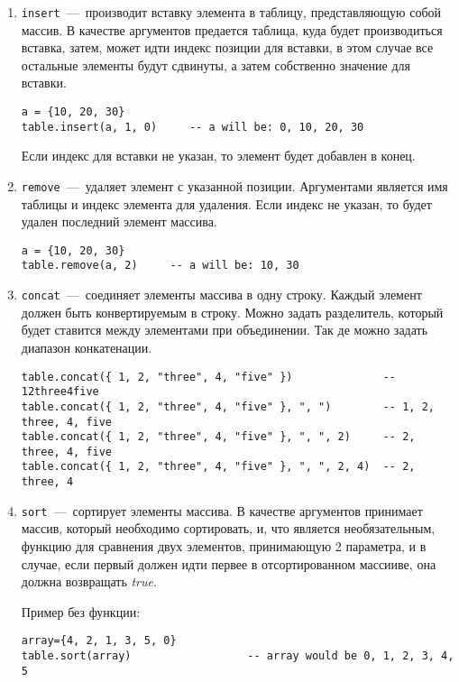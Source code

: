 \begin{enumerate}
	\item \lstinline{insert}~---~производит вставку элемента в таблицу, представляющую собой массив. В качестве аргументов предается таблица, куда будет производиться вставка, затем, может идти индекс позиции для вставки, в этом случае все остальные элементы будут сдвинуты, а затем собственно значение для вставки. 
	
\begin{lstlisting}
a = {10, 20, 30}
table.insert(a, 1, 0)     -- a will be: 0, 10, 20, 30
\end{lstlisting}

	Если индекс для вставки не указан, то элемент будет добавлен в конец.
	
	\item \lstinline{remove}~---~удаляет элемент с указанной позиции. Аргументами является имя таблицы и индекс элемента для удаления. Если индекс не указан, то будет удален последний элемент массива. 

\begin{lstlisting}
a = {10, 20, 30}
table.remove(a, 2)     -- a will be: 10, 30
\end{lstlisting}

	\item \lstinline{concat}~---~соединяет элементы массива в одну строку. Каждый элемент должен быть конвертируемым в строку.  Можно задать разделитель, который будет ставится между элементами при объединении. Так де можно задать диапазон конкатенации.
	 
\begin{lstlisting}
table.concat({ 1, 2, "three", 4, "five" })           	-- 12three4five
table.concat({ 1, 2, "three", 4, "five" }, ", ")     	-- 1, 2, three, 4, five
table.concat({ 1, 2, "three", 4, "five" }, ", ", 2)  	-- 2, three, 4, five
table.concat({ 1, 2, "three", 4, "five" }, ", ", 2, 4)  -- 2, three, 4
\end{lstlisting}

	\item \lstinline{sort}~---~сортирует элементы массива. В качестве аргументов принимает массив, который необходимо сортировать, и, что является необязательным, функцию для сравнения двух элементов, принимающую 2 параметра, и в случае, если первый должен идти первее в отсортированном массииве, она должна возвращать \emph{true}. 

Пример без функции:	
\begin{lstlisting}
array={4, 2, 1, 3, 5, 0}
table.sort(array)                  -- array would be 0, 1, 2, 3, 4, 5
\end{lstlisting}


\end{enumerate}
